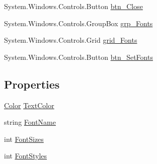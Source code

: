 \begin{DoxyCompactItemize}
System.\+Windows.\+Controls.\+Button \hyperlink{class_c_p_u___o_s___simulator_1_1_console_window_a532cd67c30fdb581d7f7cdccacb388ff}{btn\+\_\+\+Close}
\item 
System.\+Windows.\+Controls.\+Group\+Box \hyperlink{class_c_p_u___o_s___simulator_1_1_console_window_a2d8d6d1f3ee210b44e0eabd3c063438d}{grp\+\_\+\+Fonts}
\item 
System.\+Windows.\+Controls.\+Grid \hyperlink{class_c_p_u___o_s___simulator_1_1_console_window_a5dd489a5756d308a9adc8498dea24ddb}{grid\+\_\+\+Fonts}
\item 
System.\+Windows.\+Controls.\+Button \hyperlink{class_c_p_u___o_s___simulator_1_1_console_window_acc0899b3327a38a47568660cf947ee31}{btn\+\_\+\+Set\+Fonts}
\end{DoxyCompactItemize}
\subsection*{Properties}
\begin{DoxyCompactItemize}
\item 
\hyperlink{_console_window_8xaml_8cs_adf2800823d988ace598d734fdec29975}{Color} \hyperlink{class_c_p_u___o_s___simulator_1_1_console_window_a9ed1d4cf5229b50e355092d33ea0c3e6}{Text\+Color}
\item 
string \hyperlink{class_c_p_u___o_s___simulator_1_1_console_window_a752c6bed63b2368b26a4287a2902ef61}{Font\+Name}
\item 
int \hyperlink{class_c_p_u___o_s___simulator_1_1_console_window_a3f0174de74f8505bc6880ec7a67cd61f}{Font\+Sizes}
\item 
int \hyperlink{class_c_p_u___o_s___simulator_1_1_console_window_a1984ceb7ee007669685c8de6c4554b06}{Font\+Styles}
\end{DoxyCompactItemize}

